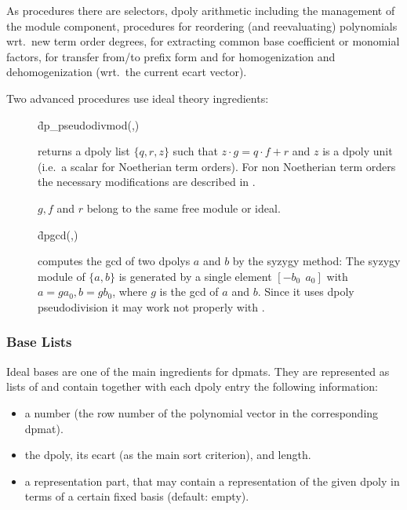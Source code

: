 As procedures there are selectors, dpoly arithmetic including the management
of the module component, procedures for reordering (and reevaluating)
polynomials wrt.\ new term order degrees, for extracting common base
coefficient or monomial factors, for transfer from/to prefix form and for
homogenization and dehomogenization (wrt.\ the current ecart vector).

Two advanced procedures use ideal theory ingredients:
\begin{description}
\item[]
  \begin{syntax}
    \f{dp\_pseudodivmod}(,)
  \end{syntax}
  \hypertarget{procedure:DP_PSEUDODIVMOD}{}
returns a dpoly list $\{q,r,z\}$ such that $z\cdot g = q\cdot f +
r$ and $z$ is a dpoly unit (i.e.\ a scalar for Noetherian term
orders). For non Noetherian term orders the necessary modifications
are described in \cite{Graebe:95a}.

$g, f$ and $r$ belong to the same free module or ideal.

\item[]
  \begin{syntax}
    \f{dpgcd}(,)
  \end{syntax}
  \hypertarget{procedure:DPGCD}{}
computes the gcd of two dpolys $a$ and $b$ by the syzygy method:
The syzygy module of $\{a,b\}$ is generated by a single element
$[-b_0\ \ a_0]$ with $a=ga_0, b=gb_0$, where $g$ is the gcd of $a$
and $b$. Since it uses dpoly pseudodivision it may work not properly
with .
\end{description}


\subsubsection{Base Lists}

Ideal bases are one of the main ingredients for dpmats. They are
represented as lists of  and contain together with
each dpoly entry the following information:
\begin{itemize}
\item a number (the row number of the polynomial vector in the
corresponding dpmat).

\item the dpoly, its ecart (as the main sort criterion), and length.

\item a representation part, that may contain a representation of the
given dpoly in terms of a certain fixed basis (default: empty).
\end{itemize}

